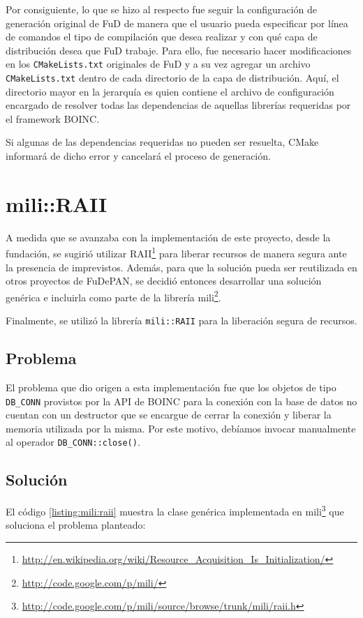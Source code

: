Por consiguiente, lo que se hizo al respecto fue seguir la configuración de generación original de FuD de manera que el usuario pueda especificar por línea de comandos el tipo de compilación que desea realizar y con qué capa de distribución desea que FuD trabaje. Para ello, fue necesario hacer modificaciones en los \texttt{CMakeLists.txt} originales de FuD y a su vez agregar un archivo \texttt{CMakeLists.txt} dentro de cada directorio de la capa de distribución. Aquí, el directorio mayor en la jerarquía es quien contiene el archivo de configuración encargado de resolver todas las dependencias de aquellas librerías requeridas por el framework BOINC.

Si algunas de las dependencias requeridas no pueden ser resuelta, CMake informará de dicho error y cancelará el proceso de generación.

\section{mili::RAII}
A medida que se avanzaba con la implementación de este proyecto, desde la fundación, se sugirió utilizar RAII\footnote{\url{http://en.wikipedia.org/wiki/Resource_Acquisition_Is_Initialization/}} para liberar recursos de manera segura ante la presencia de imprevistos. Además, para que la solución pueda ser reutilizada en otros proyectos de FuDePAN, se decidió entonces desarrollar una solución genérica e incluirla como parte de la librería mili\footnote{\url{http://code.google.com/p/mili/}}. 

Finalmente, se utilizó la librería \texttt{mili::RAII} para la liberación segura de recursos.

\subsection{Problema}
El problema que dio origen a esta implementación fue que los objetos de tipo \texttt{DB\_CONN} provistos por la API de BOINC para la conexión con la base de datos no cuentan con un destructor que se encargue de cerrar la conexión y liberar la memoria utilizada por la misma. Por este motivo, debíamos invocar manualmente al operador \texttt{DB\_CONN::close()}.

\subsection{Solución}
El código \ref{listing:mili:raii} muestra la clase genérica implementada en mili\footnote{\url{http://code.google.com/p/mili/source/browse/trunk/mili/raii.h}} que soluciona el problema planteado:

